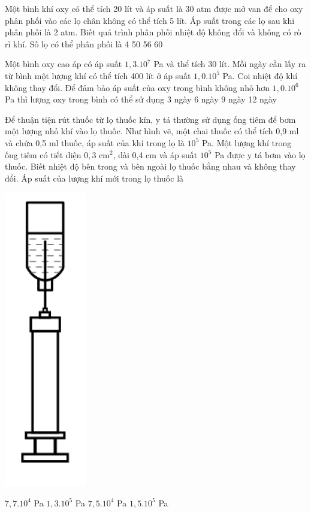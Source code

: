 \documentclass[12pt,a4paper]{article}
\begin{document}
\begin{multicols}{2}
	\begin{ex}
		Một bình khí oxy có thể tích 20 lít và áp suất là 30 atm được mở van để cho oxy phân phối vào các lọ chân không có thể tích 5 lít. Áp suất trong các lọ sau khi phân phối là 2 atm. Biết quá trình phân phối nhiệt độ không đổi và không có rò rỉ khí. Số lọ có thể phân phối là
		\choice
		{4}
		{50}
		{56}
		{60}
	\end{ex}
	
	\begin{ex}
		Một bình oxy cao áp có áp suất $1,3.10^7$ Pa và thể tích 30 lít. Mỗi ngày cần lấy ra từ bình một lượng khí có thể tích 400 lít ở áp suất $1,0.10^5$ Pa. Coi nhiệt độ khí không thay đổi. Để đảm bảo áp suất của oxy trong bình không nhỏ hơn $1,0.10^6$ Pa thì lượng oxy trong bình có thể sử dụng
		\choice
		{3 ngày}
		{6 ngày}
		{9 ngày}
		{12 ngày}
	\end{ex}
	
	\begin{ex}
		Để thuận tiện rút thuốc từ lọ thuốc kín, y tá thường sử dụng ống tiêm để bơm một lượng nhỏ khí vào lọ thuốc. Như hình vẽ, một chai thuốc có thể tích 0,9 ml và chứa 0,5 ml thuốc, áp suất của khí trong lọ là $10^5$ Pa. Một lượng khí trong ống tiêm có tiết diện $0,3 \text{ cm}^2$, dài 0,4 cm và áp suất $10^5$ Pa được y tá bơm vào lọ thuốc. Biết nhiệt độ bên trong và bên ngoài lọ thuốc bằng nhau và không thay đổi. Áp suất của lượng khí mới trong lọ thuốc là
		\begin{center}
			\includegraphics[scale=0.3]{img/1.png}
		\end{center}
		\choice
		{$7,7.10^4$ Pa}
		{$1,3.10^5$ Pa}
		{$7,5.10^4$ Pa}
		{$1,5.10^5$ Pa}
	\end{ex}
	

\end{multicols}
\end{document}
